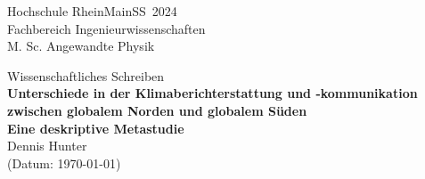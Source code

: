 \documentclass[%
fontsize=10,%
onecolumn,%
BCOR=0pt,%
DIV=15,%
overfullrule=true,%
titlepage=false,%
]{scrartcl}
\begin{document}
\begin{flushleft}
{\Large Hochschule RheinMain\hfill SS~2024\\}Fachbereich Ingenieurwissenschaften\\M. Sc. Angewandte Physik
\end{flushleft}
\vspace{2\baselineskip}
{%
\centering
{\Large Wissenschaftliches Schreiben\\}
\vspace{2\baselineskip}
{\huge \textbf{Unterschiede in der Klimaberichterstattung und -kommunikation zwischen globalem Norden und globalem Süden}\\}
\vspace{\baselineskip}
{\Large \textbf{Eine deskriptive Metastudie}\\}
\vspace{2\baselineskip}
{\large Dennis Hunter\\(Datum: \today)\\}
\vspace{1\baselineskip}
}

\vspace{\baselineskip}
\begin{multicols}{2}
    
\end{multicols}
\printbibliography%
\end{document}
